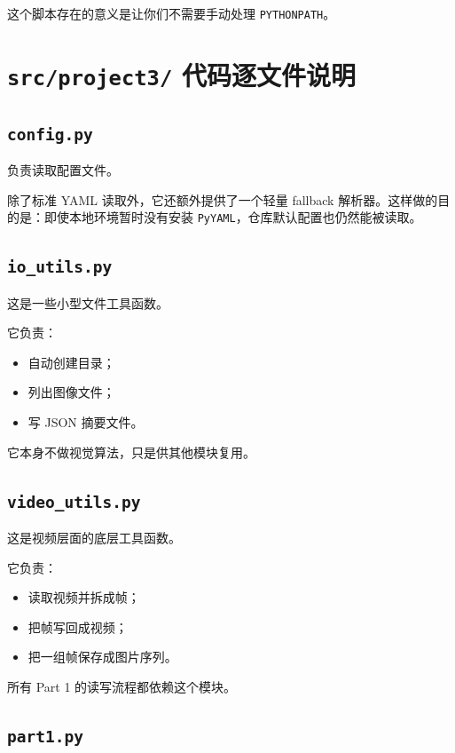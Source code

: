 \documentclass[11pt,a4paper,fontset=none]{ctexart}
\begin{document}
这个脚本存在的意义是让你们不需要手动处理 \texttt{PYTHONPATH}。

\section{\texttt{src/project3/} 代码逐文件说明}

\subsection{\texttt{config.py}}

负责读取配置文件。

除了标准 YAML 读取外，它还额外提供了一个轻量 fallback 解析器。这样做的目的是：即使本地环境暂时没有安装 \texttt{PyYAML}，仓库默认配置也仍然能被读取。

\subsection{\texttt{io\_utils.py}}

这是一些小型文件工具函数。

它负责：

\begin{itemize}
  \item 自动创建目录；
  \item 列出图像文件；
  \item 写 JSON 摘要文件。
\end{itemize}

它本身不做视觉算法，只是供其他模块复用。

\subsection{\texttt{video\_utils.py}}

这是视频层面的底层工具函数。

它负责：

\begin{itemize}
  \item 读取视频并拆成帧；
  \item 把帧写回成视频；
  \item 把一组帧保存成图片序列。
\end{itemize}

所有 Part 1 的读写流程都依赖这个模块。

\subsection{\texttt{part1.py}}
\end{document}
